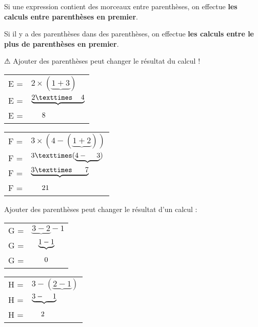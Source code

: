 \documentclass[../€Cours-complet/Cours-complet]{subfiles}
\begin{document}
\begin{cours}
	Si une expression contient des morceaux entre parenthèses, on effectue \textbf{les calculs entre parenthèses en premier}.

	Si il y a des parenthèses dans des parenthèses, on effectue
	\textbf{les calculs entre le plus de parenthèses en premier}.

	{\color{red} ⚠ Ajouter des parenthèses peut changer le résultat du calcul !}
\end{cours}

\begin{exemple}
	\begin{minipage}{0.5\textwidth}
		\begin{tabular}{ll}
			E = & $2 × (\underbrace{1 + 3})$          \\
			E = & $\underbrace{2 × \hspace{1.2em} 4}$ \\
			E = & $\hspace{1.5em}8$
		\end{tabular}
	\end{minipage}
	\begin{minipage}{0.5\textwidth}
		\begin{tabular}{ll}
			F = & $3 × (4 - (\underbrace{1 + 2}))$         \\
			F = & $3 × (\underbrace{4 - \hspace{1.3em}3})$ \\
			F = & $\underbrace{3 × \hspace{1.8em}7}$       \\
			F = & $\hspace{1.5em}21$
		\end{tabular}
	\end{minipage}
\end{exemple}

\begin{exemple}
	Ajouter des parenthèses peut changer le résultat d'un calcul :

	\begin{minipage}{0.5\textwidth}
		\begin{tabular}{ll}
			G = & $\underbrace{3 - 2} - 1$           \\
			G = & $\hspace{0.9em}\underbrace{1 - 1}$ \\
			G = & $\hspace{1.7em}0$
		\end{tabular}
	\end{minipage}
	\begin{minipage}{0.5\textwidth}
		\begin{tabular}{ll}
			H = & $3 - (\underbrace{2 - 1})$          \\
			H = & $\underbrace{3 - \hspace{1.2em} 1}$ \\
			H = & $\hspace{1.3em}2$
		\end{tabular}
	\end{minipage}
\end{exemple}
\end{document}
